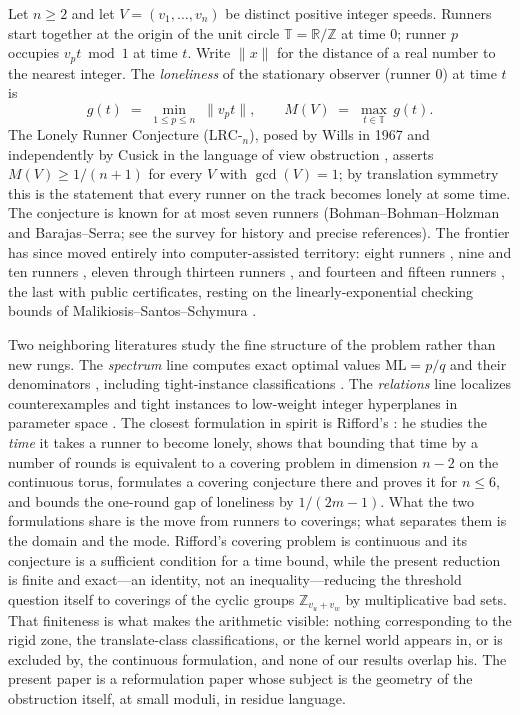 \documentclass[11pt,a4paper]{article}
\numberwithin{equation}{section}
\theoremstyle{plain}
\theoremstyle{plain}
\theoremstyle{definition}
\theoremstyle{remark}
\newcommand{\Z}{\mathbb{Z}}
\newcommand{\R}{\mathbb{R}}
\newcommand{\T}{\mathbb{T}}
\newcommand{\wnc}[1]{\lVert #1 \rVert}
\begin{document}
Let $n\ge 2$ and let $V=(v_1,\dots,v_n)$ be distinct positive integer
speeds. Runners start together at the origin of the unit circle
$\T=\R/\Z$ at time $0$; runner $p$ occupies $v_p t \bmod 1$ at time $t$.
Write $\wnc{x}$ for the distance of a real number to the nearest integer.
The \emph{loneliness} of the stationary observer (runner $0$) at time $t$
is
\[
g(t)\;=\;\min_{1\le p\le n}\;\wnc{v_p t},
\qquad
M(V)\;=\;\max_{t\in\T}\,g(t).
\]
The Lonely Runner Conjecture ($\mathrm{LRC}$-$_n$), posed by Wills in 1967
and independently by Cusick in the language of view obstruction
\cite{PS-survey,Wills,Cusick1973}, asserts $M(V)\ge 1/(n{+}1)$ for every $V$ with
$\gcd(V)=1$; by translation symmetry this is the statement that every
runner on the track becomes lonely at some time. The conjecture is known
for at most seven runners (Bohman--Bohman--Holzman and
Barajas--Serra; see the survey \cite{PS-survey} for history and precise
references). The frontier has since moved entirely into computer-assisted
territory: eight runners \cite{Rosenfeld8}, nine and ten runners
\cite{Trakulthongchai}, eleven through thirteen runners
\cite{Sungkawichai}, and fourteen and fifteen runners \cite{Allikvere},
the last with public certificates, resting on the linearly-exponential
checking bounds of Malikiosis--Santos--Schymura \cite{MSS}.

Two neighboring literatures study the fine structure of the problem rather
than new rungs. The \emph{spectrum} line computes exact optimal values
$\mathrm{ML}=p/q$ and their denominators
\cite{Kravitz,FanSun,GiriKravitz,Cordella}, including tight-instance
classifications \cite{Zhang}. The \emph{relations} line localizes
counterexamples and tight instances to low-weight integer hyperplanes in
parameter space \cite{BeckEverett}. The closest formulation in spirit is
Rifford's \cite{Rifford}: he studies the \emph{time} it takes a runner to
become lonely, shows that bounding that time by a number of rounds is
equivalent to a covering problem in dimension $n-2$ on the continuous torus,
formulates a covering conjecture there and proves it for $n\le 6$, and
bounds the one-round gap of loneliness by $1/(2m-1)$. What the two
formulations share is the move from runners to coverings; what separates
them is the domain and the mode. Rifford's covering problem is continuous
and its conjecture is a sufficient condition for a time bound, while the
present reduction is finite and exact---an identity, not an
inequality---reducing the threshold question itself to coverings of the
cyclic groups $\Z_{v_u+v_w}$ by multiplicative bad sets. That finiteness is
what makes the arithmetic visible: nothing corresponding to the rigid zone,
the translate-class classifications, or the kernel world appears in, or is
excluded by, the continuous formulation, and none of our results overlap
his. The present paper is a reformulation paper whose subject is the
geometry of the obstruction itself, at small moduli, in residue language.
\end{document}
